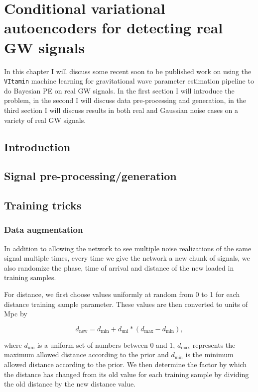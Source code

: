 \chapter{Conditional variational autoencoders for detecting real GW signals}

In this chapter I will discuss some recent soon to be published work on using the \texttt{VItamin} machine learning for gravitational wave parameter estimation pipeline to do Bayesian PE on real \ac{GW} signals. In the first section I will introduce the problem, in the second I will discuss data pre-processing and generation, in the third section I will discuss results in both real and Gaussian noise cases on a variety of real \ac{GW} signals.

\section{Introduction}

\section{Signal pre-processing/generation}

\section{Training tricks}

\subsection{Data augmentation}

In addition to allowing the network to see multiple noise realizations 
of the same signal multiple times, every time we give the network 
a new chunk of signals, we also randomize the phase, time of arrival and 
distance of the new loaded in training samples.

%
%
For distance, we first choose values uniformly at random from 0 to 1 for 
each distance training sample parameter. These values are then 
converted to units of Mpc by 

\begin{equation}\label{eq:dist_rescale}
    d_{\textrm{new}} = d_{\textrm{min}} + d_{\textrm{uni}}*(d_{\textrm{max}} - d_{\textrm{min}}),
\end{equation}

where $d_{\textrm{uni}}$ is a uniform set of numbers between 0 and 1, 
$d_{\textrm{max}}$ represents the maximum allowed distance according to the prior and $d_{\textrm{min}}$ is the minimum allowed distance according to the prior. We then determine the factor by which the distance has changed from its old value for each training sample by dividing the old distance by the new distance value.

